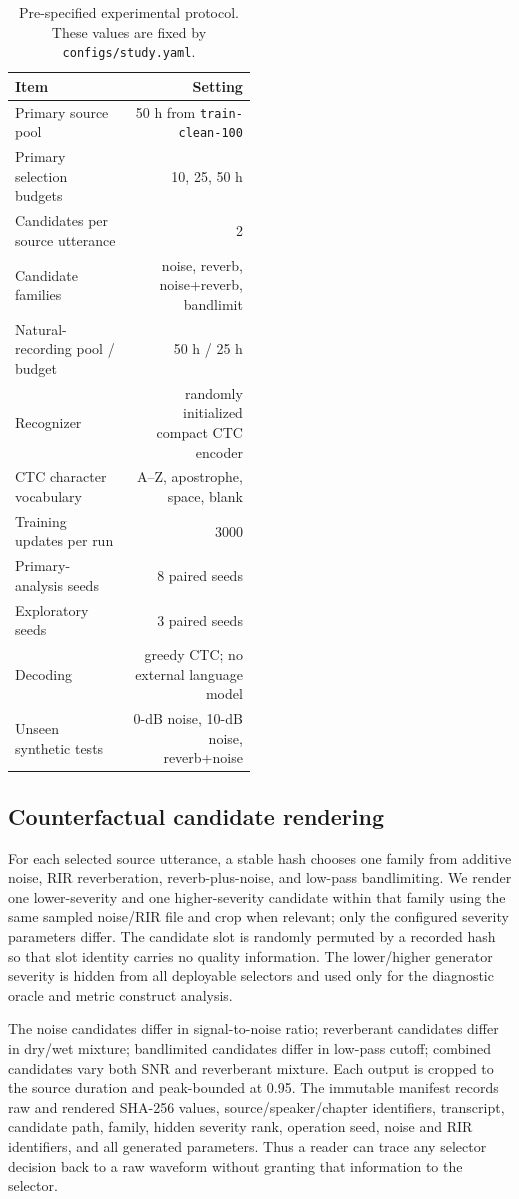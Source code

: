 \documentclass[10pt,twocolumn]{article}
\begin{document}
\begin{table}[t]
\caption{Pre-specified experimental protocol. These values are fixed by \texttt{configs/study.yaml}.}
\label{tab:protocol}
\centering
\small
\begin{tabular}{p{0.48\linewidth}r}
\toprule
Item & Setting \\
\midrule
Primary source pool & 50 h from \texttt{train-clean-100} \\
Primary selection budgets & 10, 25, 50 h \\
Candidates per source utterance & 2 \\
Candidate families & noise, reverb, noise+reverb, bandlimit \\
Natural-recording pool / budget & 50 h / 25 h \\
Recognizer & randomly initialized compact CTC encoder \\
CTC character vocabulary & A--Z, apostrophe, space, blank \\
Training updates per run & 3000 \\
Primary-analysis seeds & 8 paired seeds \\
Exploratory seeds & 3 paired seeds \\
Decoding & greedy CTC; no external language model \\
Unseen synthetic tests & 0-dB noise, 10-dB noise, reverb+noise \\
\bottomrule
\end{tabular}
\end{table}

\subsection{Counterfactual candidate rendering}

For each selected source utterance, a stable hash chooses one family from additive noise, RIR reverberation, reverb-plus-noise, and low-pass bandlimiting. We render one lower-severity and one higher-severity candidate within that family using the same sampled noise/RIR file and crop when relevant; only the configured severity parameters differ. The candidate slot is randomly permuted by a recorded hash so that slot identity carries no quality information. The lower/higher generator severity is hidden from all deployable selectors and used only for the diagnostic oracle and metric construct analysis.

The noise candidates differ in signal-to-noise ratio; reverberant candidates differ in dry/wet mixture; bandlimited candidates differ in low-pass cutoff; combined candidates vary both SNR and reverberant mixture. Each output is cropped to the source duration and peak-bounded at 0.95. The immutable manifest records raw and rendered SHA-256 values, source/speaker/chapter identifiers, transcript, candidate path, family, hidden severity rank, operation seed, noise and RIR identifiers, and all generated parameters. Thus a reader can trace any selector decision back to a raw waveform without granting that information to the selector.
\end{document}
